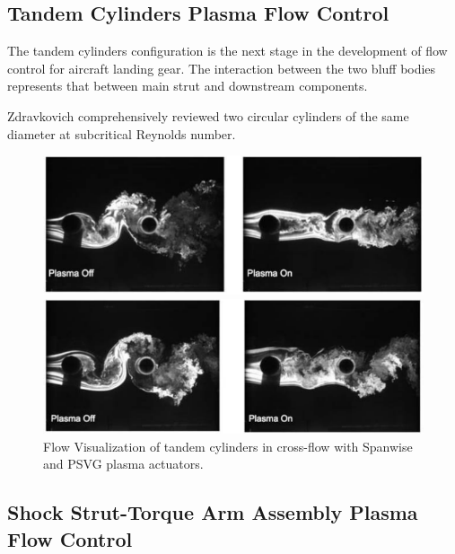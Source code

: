 \subsection{Tandem Cylinders Plasma Flow Control}

The tandem cylinders configuration is the next stage in the development of flow control for aircraft landing gear. The interaction between the two bluff bodies represents that between main strut and downstream components. 

Zdravkovich comprehensively reviewed two circular cylinders of the same diameter at subcritical Reynolds number. 

\cite{zdrovkovich}

\cite{kozlov}
\cite{khorami}
\cite{wang}






\begin{figure}
	\begin{center}
		\centerline{\includegraphics[scale=1.0]{figures/tandem_span}}
		\centerline{\includegraphics[scale=1.0]{figures/tandem_psvg}}
		\caption{Flow Visualization of tandem cylinders in cross-flow with Spanwise and PSVG plasma actuators.}
		\label{fig:cyl2}
	\end{center}
\end{figure}

\subsection{Shock Strut-Torque Arm Assembly Plasma Flow Control}

